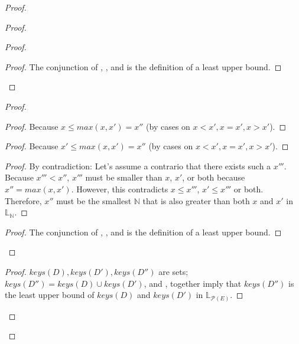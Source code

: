 \documentclass[9pt, oneside]{article}   	%
\begin{document}
\begin{proof}
\begin{proof}
\begin{proof}
			\qedstep
			\begin{proof}
				The conjunction of , , and  is the definition of a least upper bound.	
			\end{proof}
		\end{proof}
		
\begin{proof}
			\begin{proof}
				Because $x \leq \textit{max}(x,x') = x''$ (by cases on $x<x', x=x', x>x'$).
			\end{proof}
			
			\begin{proof}
				Because $x' \leq \textit{max}(x,x') = x''$ (by cases on $x<x', x=x', x>x'$).
			\end{proof}
			
			\begin{proof}
				By contradiction: Let's assume a contrario that there exists such a $x'''$. Because $x''' < x''$, $x'''$ must be smaller than $x$, $x'$, or both because $x'' = \textit{max}(x,x')$. However, this contradicts $ x \leq x'''$,  $x' \leq x'''$ or both. Therefore, $x''$ must be the smallest $\mathds{N}$ that is also greater than both $x$ and $x'$ in $\mathds{L}_\mathds{N}$.
			\end{proof}

			\qedstep
			\begin{proof}
				The conjunction of , , and  is the definition of a least upper bound.	
			\end{proof}
		\end{proof}
		
		
		\begin{proof}
			$\textit{keys}(D), \textit{keys}(D'), \textit{keys}(D'')$ are sets; $\textit{keys}(D'') = \textit{keys}(D) \cup \textit{keys}(D')$, and , together imply that $\textit{keys}(D'')$ is the least upper bound of $\textit{keys}(D)$ and $\textit{keys}(D')$ in $\mathds{L}_{\mathcal{P}(E)}$.
		\end{proof}
		

\end{proof}
\end{proof}
\end{document}
